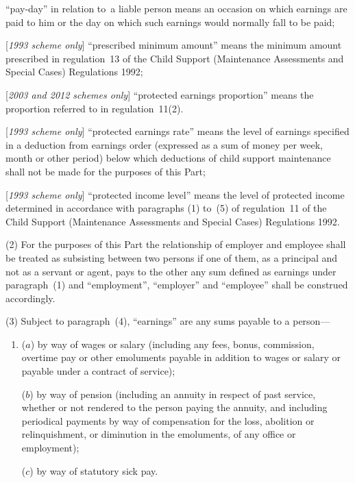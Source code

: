 \documentclass[12pt,a4paper]{article}
\begin{document}
\begin{enumerate}
“pay-day” in relation to~a liable person means an occasion on which earnings are paid to him or the day on which such earnings would normally fall to be paid;

[\emph{1993 scheme only}] “prescribed minimum amount” means the minimum amount prescribed in regulation~13 of the Child Support (Maintenance Assessments and Special Cases) Regulations 1992;

[\emph{2003 and 2012 schemes only}] “protected earnings proportion” means the proportion referred to in regulation~11(2).

[\emph{1993 scheme only}] “protected earnings rate” means the level of earnings specified in a deduction from earnings order (expressed as a sum of money per week, month or other period) below which deductions of child support maintenance shall not be made for the purposes of this Part;

[\emph{1993 scheme only}] “protected income level” means the level of protected income determined in accordance with 
paragraphs (1) to~(5) of  %
regulation~11 of the Child Support (Maintenance Assessments and Special Cases) Regulations 1992.
\end{enumerate}

(2) For the purposes of this Part the relationship of employer and employee shall be treated as subsisting between two persons if one of them, as a principal and not as a servant or agent, pays to the other any sum defined as earnings under paragraph~(1) and “employment”, “employer” and “employee” shall be construed accordingly.

(3) Subject to paragraph~(4), “earnings” are any sums payable to a person—
\begin{enumerate}\item[]
($a$) by way of wages or salary (including any fees, bonus, commission, overtime pay or other emoluments payable in addition to wages or salary or payable under a contract of service);

($b$) by way of pension (including an annuity in respect of past service, whether or not rendered to the person paying the annuity, and including periodical payments by way of compensation for the loss, abolition or relinquishment, or diminution in the emoluments, of any office or employment);

($c$) by way of statutory sick pay.
\end{enumerate}
\end{document}
